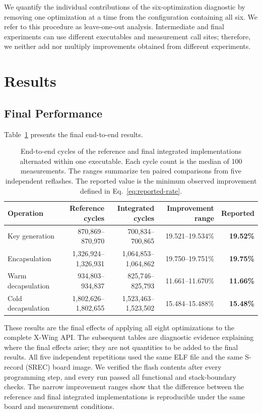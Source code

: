\documentclass[runningheads,orivec]{llncs}
\newcommand{\xwing}{X-Wing}
\begin{document}
We quantify the individual contributions of the six-optimization diagnostic by
removing one optimization at a time from the configuration containing all six.
We refer to this procedure as leave-one-out analysis. Intermediate and final
experiments can use different executables and measurement call sites; therefore,
we neither add nor multiply improvements obtained from different experiments.

\FloatBarrier
\section{Results}\label{sec:results}

\subsection{Final Performance}

Table~\ref{tab:final-performance} presents the final end-to-end results.
\begin{table}[t]
\centering
\caption{End-to-end cycles of the reference and final integrated
implementations alternated within one executable. Each cycle count is the
median of 100 measurements. The ranges summarize ten paired comparisons from
five independent reflashes. The reported value is the minimum observed
improvement defined in Eq.~\eqref{eq:reported-rate}.}
\label{tab:final-performance}
\scriptsize
\setlength{\tabcolsep}{2.2pt}
\begin{tabular}{@{}lrrrr@{}}
\toprule
Operation & Reference cycles & Integrated cycles & Improvement range & Reported \\
\midrule
Key generation & 870,869--870,970 & 700,834--700,865 & 19.521--19.534\% & \textbf{19.52\%} \\
Encapsulation & 1,326,924--1,326,931 & 1,064,853--1,064,862 & 19.750--19.751\% & \textbf{19.75\%} \\
Warm decapsulation & 934,803--934,837 & 825,746--825,793 & 11.661--11.670\% & \textbf{11.66\%} \\
Cold decapsulation & 1,802,626--1,802,655 & 1,523,463--1,523,502 & 15.484--15.488\% & \textbf{15.48\%} \\
\bottomrule
\end{tabular}
\end{table}

These results are the final effects of applying all eight optimizations to the
complete \xwing{} API. The subsequent tables are diagnostic evidence explaining
where the final effects arise; they are not quantities to be added to the final
results. All five independent repetitions used the same ELF file and the same
S-record (SREC) board image. We verified the flash contents after every
programming step, and every run passed all functional and stack-boundary checks.
The narrow improvement ranges show that the difference between the reference
and final integrated implementations is reproducible under the same board and
measurement conditions.
\end{document}
